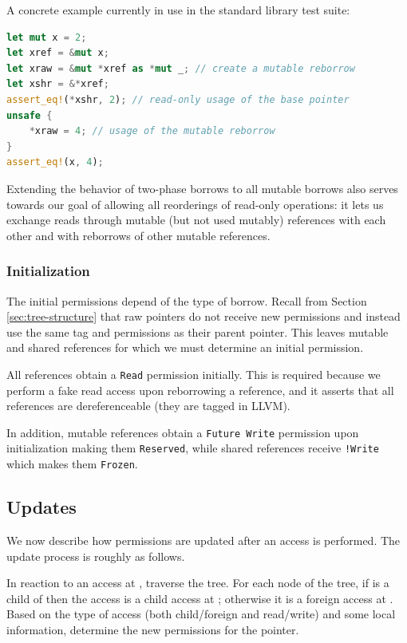 \documentclass[a4paper,11pt]{article}
\theoremstyle{plain}
\theoremstyle{definition}
\theoremstyle{remark}
\newcommand{\tcode}[1]{\rstinline{#1}}
\newcommand{\tperm}[1]{\texttt{#1}}
\begin{document}
A concrete example currently in use in the standard library test suite:
\begin{lstlisting}[language=rust]
let mut x = 2;
let xref = &mut x;
let xraw = &mut *xref as *mut _; // create a mutable reborrow
let xshr = &*xref;
assert_eq!(*xshr, 2); // read-only usage of the base pointer
unsafe {
    *xraw = 4; // usage of the mutable reborrow
}
assert_eq!(x, 4);
\end{lstlisting}

Extending the behavior of two-phase borrows to all mutable borrows also serves
towards our goal of allowing all reorderings of read-only operations: it lets
us exchange reads through mutable (but not used mutably) references with each
other and with reborrows of other mutable references.

\subsubsection{Initialization}

The initial permissions depend of the type of borrow.
Recall from Section \ref{sec:tree-structure} that raw pointers do not receive new permissions and instead
use the same tag and permissions as their parent pointer. This leaves mutable and
shared references for which we must determine an initial permission.

All references obtain a \tperm{Read} permission initially. This is required
because we perform a fake read access upon reborrowing a reference, and it asserts
that all references are dereferenceable (they are tagged \tcode{dereferenceable}
in LLVM).

In addition, mutable references obtain a \tperm{Future Write} permission upon initialization
making them \tperm{Reserved}, while shared references receive \tperm{!Write} which makes them \tperm{Frozen}.

\subsection{Updates}
\label{sec:transitions}

We now describe how permissions are updated after an access is performed.
The update process is roughly as follows.

In reaction to an access at \tcode{t0}, traverse the tree. For each \tcode{t1} node of the
tree, if \tcode{t0} is a child of \tcode{t1} then the access is a child access at \tcode{t1}; otherwise
it is a foreign access at \tcode{t1}. Based on the type of access (both child/foreign
and read/write) and some local information, determine the new permissions for the
pointer.
\end{document}
